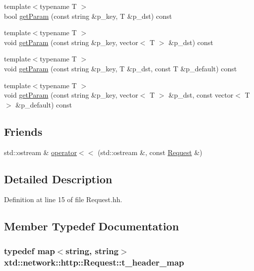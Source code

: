 \begin{DoxyCompactItemize}
\item 
{\footnotesize template$<$typename T $>$ }\\bool \hyperlink{classxtd_1_1network_1_1http_1_1Request_a2d7c1f674b8935120f6f20cd6baccd63}{get\-Param} (const string \&p\-\_\-key, T \&p\-\_\-dst) const 
\item 
{\footnotesize template$<$typename T $>$ }\\void \hyperlink{classxtd_1_1network_1_1http_1_1Request_a00b5483c07f655a7a2b40a4db8190a1e}{get\-Param} (const string \&p\-\_\-key, vector$<$ T $>$ \&p\-\_\-dst) const 
\item 
{\footnotesize template$<$typename T $>$ }\\void \hyperlink{classxtd_1_1network_1_1http_1_1Request_a1c75bacd611d64713664efb796f33d25}{get\-Param} (const string \&p\-\_\-key, T \&p\-\_\-dst, const T \&p\-\_\-default) const 
\item 
{\footnotesize template$<$typename T $>$ }\\void \hyperlink{classxtd_1_1network_1_1http_1_1Request_ac3b9fbaba2751dfaa8f028e31f53c0f9}{get\-Param} (const string \&p\-\_\-key, vector$<$ T $>$ \&p\-\_\-dst, const vector$<$ T $>$ \&p\-\_\-default) const 
\end{DoxyCompactItemize}
\subsection*{Friends}
\begin{DoxyCompactItemize}
\item 
std\-::ostream \& \hyperlink{classxtd_1_1network_1_1http_1_1Request_a4ef55dada327d66bc23474520e1ae32c}{operator$<$$<$} (std\-::ostream \&, const \hyperlink{classxtd_1_1network_1_1http_1_1Request}{Request} \&)
\end{DoxyCompactItemize}


\subsection{Detailed Description}


Definition at line 15 of file Request.\-hh.



\subsection{Member Typedef Documentation}
\hypertarget{classxtd_1_1network_1_1http_1_1Request_aeaf2a69c884e81983aebaf36518c310e}{
\subsubsection[{t\-\_\-header\-\_\-map}]{\setlength{\rightskip}{0pt plus 5cm}typedef map$<$string, string$>$ {\bf xtd\-::network\-::http\-::\-Request\-::t\-\_\-header\-\_\-map}}}\label{classxtd_1_1network_1_1http_1_1Request_aeaf2a69c884e81983aebaf36518c310e}


